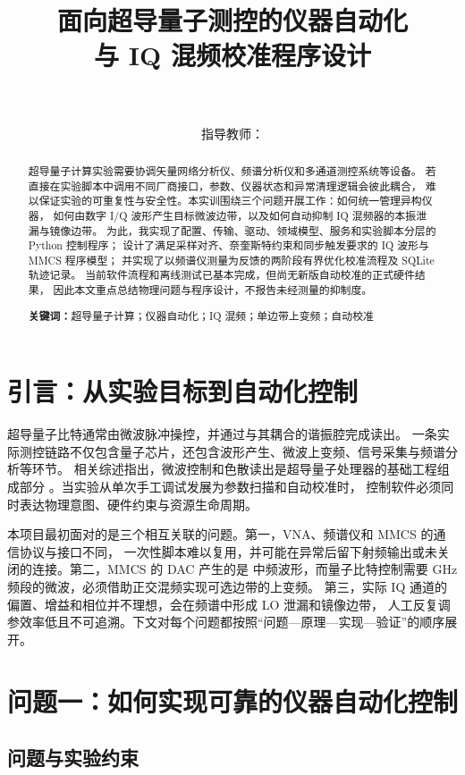 \documentclass[UTF8,zihao=-4,a4paper]{ctexart}
\title{\bfseries\LARGE 面向超导量子测控的仪器自动化\\[0.25em]
与 IQ 混频校准程序设计}
\author{\reportauthor\quad \studentid\\
\university\quad \laboratory\\
指导教师：\advisor}
\date{\projectdate}
\begin{document}
\maketitle

\begin{abstract}
超导量子计算实验需要协调矢量网络分析仪、频谱分析仪和多通道测控系统等设备。
若直接在实验脚本中调用不同厂商接口，参数、仪器状态和异常清理逻辑会彼此耦合，
难以保证实验的可重复性与安全性。本实训围绕三个问题开展工作：如何统一管理异构仪器，
如何由数字 I/Q 波形产生目标微波边带，以及如何自动抑制 IQ 混频器的本振泄漏与镜像边带。
为此，我实现了配置、传输、驱动、领域模型、服务和实验脚本分层的 Python 控制程序；
设计了满足采样对齐、奈奎斯特约束和同步触发要求的 IQ 波形与 MMCS 程序模型；
并实现了以频谱仪测量为反馈的两阶段有界优化校准流程及 SQLite 轨迹记录。
当前软件流程和离线测试已基本完成，但尚无新版自动校准的正式硬件结果，
因此本文重点总结物理问题与程序设计，不报告未经测量的抑制度。

\noindent\textbf{关键词：}超导量子计算；仪器自动化；IQ 混频；单边带上变频；自动校准
\end{abstract}

\section{引言：从实验目标到自动化控制}

超导量子比特通常由微波脉冲操控，并通过与其耦合的谐振腔完成读出。
一条实际测控链路不仅包含量子芯片，还包含波形产生、微波上变频、信号采集与频谱分析等环节。
相关综述指出，微波控制和色散读出是超导量子处理器的基础工程组成部分
\cite{krantz2019,blais2021}。当实验从单次手工调试发展为参数扫描和自动校准时，
控制软件必须同时表达物理意图、硬件约束与资源生命周期。

本项目最初面对的是三个相互关联的问题。第一，VNA、频谱仪和 MMCS 的通信协议与接口不同，
一次性脚本难以复用，并可能在异常后留下射频输出或未关闭的连接。第二，MMCS 的 DAC 产生的是
中频波形，而量子比特控制需要 GHz 频段的微波，必须借助正交混频实现可选边带的上变频。
第三，实际 IQ 通道的偏置、增益和相位并不理想，会在频谱中形成 LO 泄漏和镜像边带，
人工反复调参效率低且不可追溯。下文对每个问题都按照“问题---原理---实现---验证”的顺序展开。

\section{问题一：如何实现可靠的仪器自动化控制}

\subsection{问题与实验约束}
\end{document}
